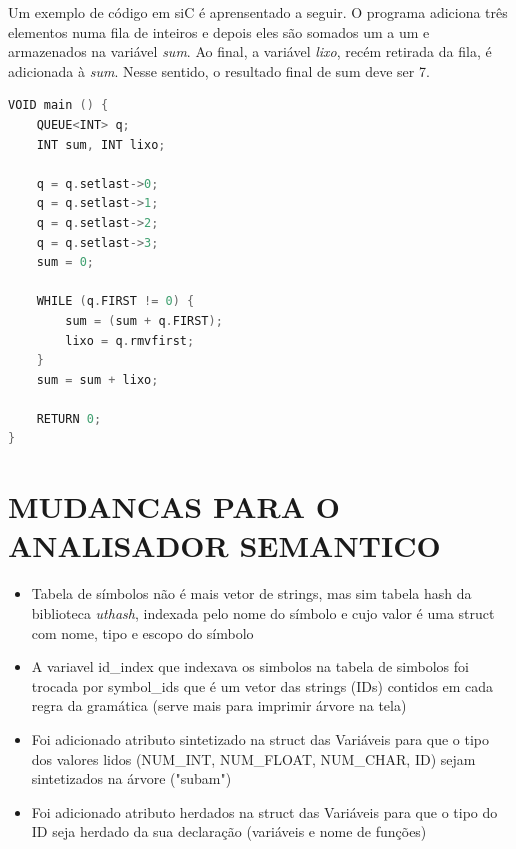\documentclass[12pt]{article}
\begin{document}
\indent Um exemplo de código em siC é aprensentado a seguir. O programa adiciona três elementos numa fila de inteiros e depois eles são somados um a um e armazenados na variável \textit{sum}. Ao final, a variável \textit{lixo}, recém retirada da fila, é adicionada à \textit{sum}. Nesse sentido, o resultado final de sum deve ser 7. \\

\begin{lstlisting}[language=C]
VOID main () {
    QUEUE<INT> q;
    INT sum, INT lixo;

    q = q.setlast->0;
    q = q.setlast->1;
    q = q.setlast->2;
    q = q.setlast->3;    
    sum = 0;
    
    WHILE (q.FIRST != 0) {    
        sum = (sum + q.FIRST);
        lixo = q.rmvfirst;
    }
    sum = sum + lixo;

    RETURN 0;
}

\end{lstlisting}

\section{MUDANCAS PARA O ANALISADOR SEMANTICO}

\begin{itemize}
\item Tabela de símbolos não é mais vetor de strings, mas sim tabela hash da biblioteca \textit{uthash}, indexada pelo nome do símbolo e cujo valor é uma struct com nome, tipo e escopo do símbolo
\item A variavel id\_index que indexava os simbolos na tabela de simbolos foi trocada por symbol\_ids que é um vetor das strings (IDs) contidos em cada regra da gramática (serve mais para imprimir árvore na tela)
\item Foi adicionado atributo sintetizado na struct das Variáveis para que o tipo dos valores lidos (NUM\_INT, NUM\_FLOAT, NUM\_CHAR, ID) sejam sintetizados na árvore ("subam")
\item Foi adicionado atributo herdados na struct das Variáveis para que o tipo do ID seja herdado da sua declaração (variáveis e nome de funções)
\end{itemize}


\end{document}
